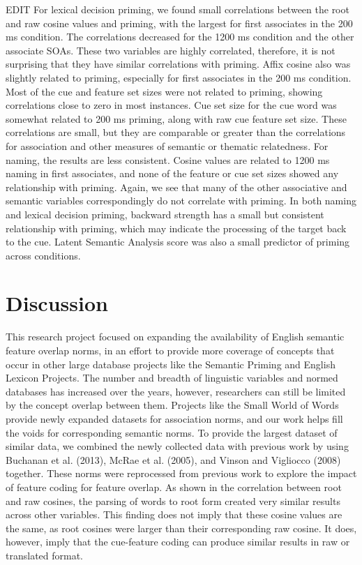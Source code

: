\documentclass[english,,man]{apa6}
\theoremstyle{definition}
\theoremstyle{definition}
\theoremstyle{definition}
\theoremstyle{remark}
\begin{document}
EDIT For lexical decision priming, we found small correlations between
the root and raw cosine values and priming, with the largest for first
associates in the 200 ms condition. The correlations decreased for the
1200 ms condition and the other associate SOAs. These two variables are
highly correlated, therefore, it is not surprising that they have
similar correlations with priming. Affix cosine also was slightly
related to priming, especially for first associates in the 200 ms
condition. Most of the cue and feature set sizes were not related to
priming, showing correlations close to zero in most instances. Cue set
size for the cue word was somewhat related to 200 ms priming, along with
raw cue feature set size. These correlations are small, but they are
comparable or greater than the correlations for association and other
measures of semantic or thematic relatedness. For naming, the results
are less consistent. Cosine values are related to 1200 ms naming in
first associates, and none of the feature or cue set sizes showed any
relationship with priming. Again, we see that many of the other
associative and semantic variables correspondingly do not correlate with
priming. In both naming and lexical decision priming, backward strength
has a small but consistent relationship with priming, which may indicate
the processing of the target back to the cue. Latent Semantic Analysis
score was also a small predictor of priming across conditions.

\hypertarget{discussion}{%
\section{Discussion}\label{discussion}}

This research project focused on expanding the availability of English
semantic feature overlap norms, in an effort to provide more coverage of
concepts that occur in other large database projects like the Semantic
Priming and English Lexicon Projects. The number and breadth of
linguistic variables and normed databases has increased over the years,
however, researchers can still be limited by the concept overlap between
them. Projects like the Small World of Words provide newly expanded
datasets for association norms, and our work helps fill the voids for
corresponding semantic norms. To provide the largest dataset of similar
data, we combined the newly collected data with previous work by using
Buchanan et al. (2013), McRae et al. (2005), and Vinson and Vigliocco
(2008) together. These norms were reprocessed from previous work to
explore the impact of feature coding for feature overlap. As shown in
the correlation between root and raw cosines, the parsing of words to
root form created very similar results across other variables. This
finding does not imply that these cosine values are the same, as root
cosines were larger than their corresponding raw cosine. It does,
however, imply that the cue-feature coding can produce similar results
in raw or translated format.
\end{document}
